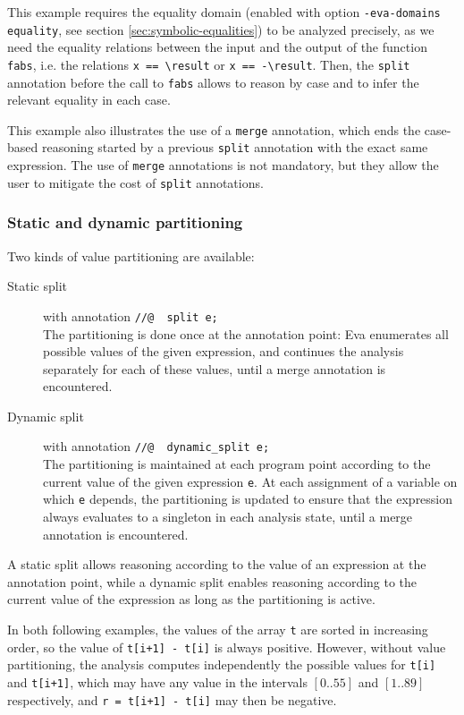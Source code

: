 \documentclass{frama-c-book}
\begin{document}

This example requires the equality domain (enabled with option
\lstinline|-eva-domains equality|, see section \ref{sec:symbolic-equalities}) to
be analyzed precisely, as we need the equality relations between the input and
the output of the function \lstinline|fabs|, i.e. the relations
\lstinline|x == \result| or \lstinline|x == -\result|.
Then, the \lstinline|split| annotation before the call to \lstinline|fabs|
allows \Eva{} to reason by case and to infer the relevant equality in each case.

This example also illustrates the use of a \lstinline|merge| annotation, which
ends the case-based reasoning started by a previous \lstinline|split| annotation
with the exact same expression.
The use of \lstinline|merge| annotations is not mandatory, but they allow the
user to mitigate the cost of \lstinline|split| annotations.

\subsubsection{Static and dynamic partitioning}

Two kinds of value partitioning are available:
\begin{description}
\item[Static split] with annotation \lstinline|//@  split e;| \\
  The partitioning is done once at the annotation point: Eva enumerates all
  possible values of the given expression, and continues the analysis separately
  for each of these values, until a merge annotation is encountered.
\item[Dynamic split] with annotation \lstinline|//@  dynamic_split e;| \\
  The partitioning is maintained at each program point according to the current
  value of the given expression \lstinline|e|. At each assignment of a variable
  on which \lstinline|e| depends, the partitioning is updated to ensure that the
  expression always evaluates to a singleton in each analysis state, until a
  merge annotation is encountered.
\end{description}

A static split allows reasoning according to the value of an expression at the
annotation point, while a dynamic split enables reasoning according to the
current value of the expression as long as the partitioning is active.

In both following examples, the values of the array \lstinline|t| are sorted in
increasing order, so the value of \lstinline|t[i+1] - t[i]| is always positive.
However, without value partitioning, the analysis computes independently the
possible values for \lstinline|t[i]| and \lstinline|t[i+1]|, which may have
any value in the intervals $[0..55]$ and $[1..89]$ respectively,
and \lstinline|r = t[i+1] - t[i]| may then be negative.
\end{document}
